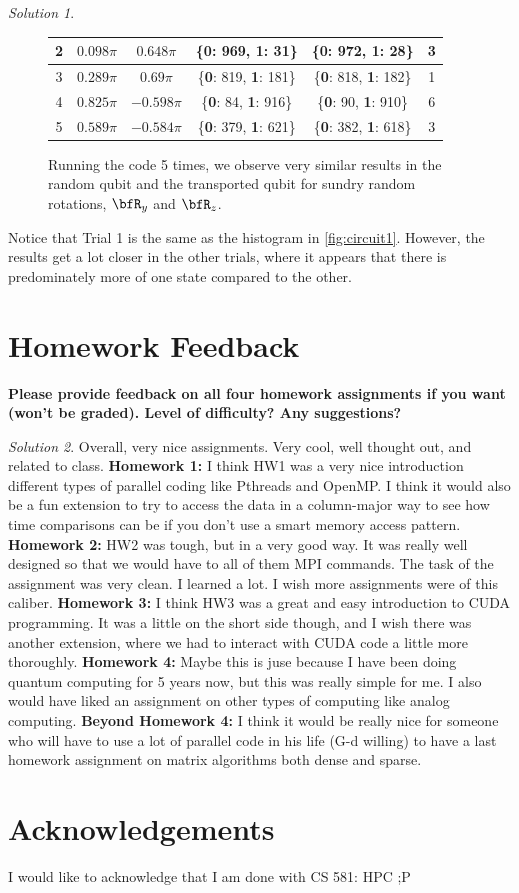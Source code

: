 \documentclass[a4paper,12pt]{article}
\theoremstyle{definition}
\theoremstyle{remark}
\newtheorem*{solution}{Solution}
\begin{document}
\begin{solution}
\begin{figure}[h]
\begin{tabular}{|c|c|c|c|c|c|}
				\hline
				2& $0.098\pi$ &$0.648\pi$  &\{\textbf{0}: 969, \textbf{1}: 31\}  & \{\textbf{0}: 972, \textbf{1}: 28\} & 3 \\
				\hline
				3& $0.289\pi$ & $0.69\pi$ & \{\textbf{0}: 819, \textbf{1}: 181\}  & \{\textbf{0}: 818, \textbf{1}: 182\}  &   1 \\
				\hline
				4& $0.825\pi$  & $-0.598\pi$  &\{\textbf{0}: 84, \textbf{1}: 916\}  &  \{\textbf{0}: 90, \textbf{1}: 910\}& 6 \\
				\hline
				5& $0.589\pi$ &$-0.584\pi$  &\{\textbf{0}: 379, \textbf{1}: 621\}  & \{\textbf{0}: 382, \textbf{1}: 618\} & 3 \\
				\hline
			\end{tabular}
			\caption{Running the code 5 times, we observe very similar results in the random qubit and the transported qubit for sundry random rotations, $\bfR_y$ and $\bfR_z$.}
			\label{tab:quantumCounts}
		\end{figure}
		Notice that Trial 1 is the same as the histogram in \ref{fig:circuit1}. However, the results get a lot closer in the other trials, where it appears that there is predominately more of one state compared to the other.
		
		
	\end{solution}
	
	
	\section{Homework Feedback}
	\textbf{Please provide feedback on all four homework assignments if you want (won't be graded). Level of difficulty? Any suggestions?}
	\begin{solution}
		Overall, very nice assignments. Very cool, well thought out, and related to class.
		\textbf{Homework 1:} I think HW1 was a very nice introduction different types of parallel coding like Pthreads and OpenMP.  I think it would also be a fun extension to try to access the data in a column-major way to see how time comparisons can be if you don't use a smart memory access pattern.
		\textbf{Homework 2:} HW2 was tough, but in a very good way. It was really well designed so that we would have to all of them MPI commands. The task of the assignment was very clean. I learned a lot. I wish more assignments were of this caliber.
		\textbf{Homework 3:} I think HW3 was a great and easy introduction to CUDA programming. It was a little on the short side though, and I wish there was another extension, where we had to interact with CUDA code a little more thoroughly.
		\textbf{Homework 4:} Maybe this is juse because I have been doing quantum computing for 5 years now, but this was really simple for me. I also would have liked an assignment on other types of computing like analog computing. 
		\textbf{Beyond Homework 4:} I think it would be really nice for someone who will have to use a lot of parallel code in his life (G-d willing) to have a last homework assignment on matrix algorithms both dense and sparse.
	\end{solution}
	
	
	
	\section*{Acknowledgements}
	I would like to acknowledge that I am done with CS 581: HPC ;P
	
\end{document}
